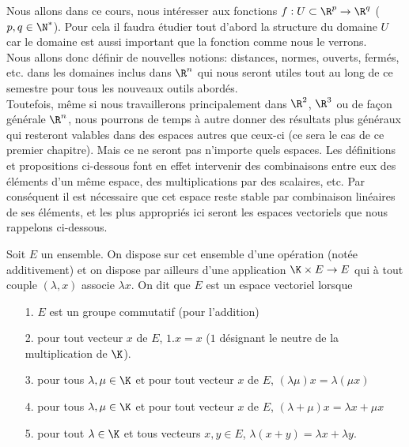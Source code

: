 \documentclass[class=report,crop=false]{standalone}
\begin{document}
 Nous allons dans ce cours, nous intéresser aux fonctions $f:U \subset \R^p \rightarrow \R^q$ ($p,q \in \N^*$). Pour cela il faudra étudier tout d'abord la structure du domaine $U$ car le domaine
est aussi important que la fonction comme nous le verrons.\\
Nous allons donc définir de nouvelles notions: distances, normes, ouverts, fermés, etc. dans les domaines inclus dans $\R^n$ qui 
nous seront utiles tout au long de ce semestre pour tous les nouveaux 
outils abordés.\\
Toutefois, même si nous travaillerons principalement dans $\R^2$, $\R^3$ ou de façon générale $\R^n$, nous pourrons de temps à autre donner des résultats plus généraux qui resteront valables dans des espaces autres que ceux-ci (ce sera le cas de ce premier chapitre). Mais ce ne seront pas n'importe quels espaces. Les définitions et propositions ci-dessous font en effet intervenir des combinaisons
entre eux des éléments d'un même espace, des multiplications par des
scalaires, etc. Par conséquent il est nécessaire que cet espace reste stable par combinaison linéaires de ses éléments, et les plus appropriés ici seront les espaces vectoriels que nous rappelons ci-dessous.\\



\begin{definition}
{\textcolor[rgb]{0.73,0.00,0.00}
\noindent Soit $E$ un ensemble. On dispose sur cet ensemble d'une opération
(notée additivement) et on dispose par ailleurs d'une application 
$\K \times E \rightarrow E$  qui à tout couple $ (\lambda , x) $
associe $\lambda x $.
On dit que $E$ est un espace vectoriel lorsque
\begin{itemize}
\item[1.] $E$ est un groupe commutatif (pour l'addition)
\item[2.] pour tout vecteur $x$ de $E$, $1.x=x$ ($1$ désignant le neutre de la
multiplication de $\K$).
\item[3.]pour tous $\lambda, \mu \in \K$ et pour tout vecteur $x$ de $E$,
$(\lambda  \mu)x=\lambda   (\mu x)$
\item[4.] pour tous $\lambda, \mu \in \K$ et pour tout vecteur $x$ de $E$,
$(\lambda + \mu)x=\lambda x + \mu x$
\item[5.] pour tout $\lambda \in \K$ et tous vecteurs $x,y \in E$, 
$\lambda (x+y)=\lambda x + \lambda y$.
\end{itemize} }
\end{definition}
\end{document}
